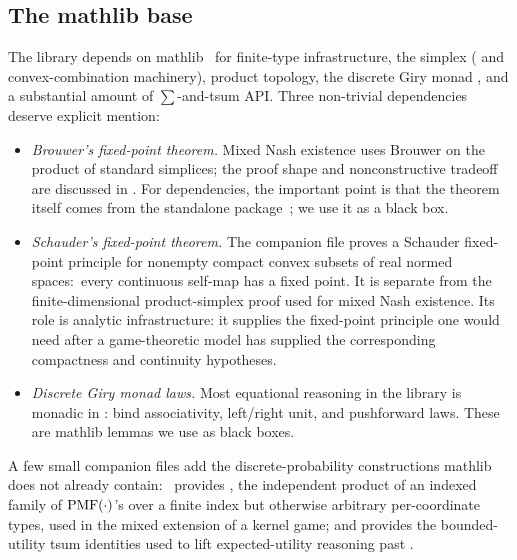 \subsection{The mathlib base}
\label{sec:prelim:mathlib}

The library depends on mathlib~\citep{mathlib2020} for finite-type
infrastructure, the simplex ( and convex-combination
machinery), product topology, the discrete Giry monad , and a
substantial amount of $\sum$-and-tsum API\@.  Three non-trivial dependencies
deserve explicit mention:

\begin{itemize}
\item \emph{Brouwer's fixed-point theorem.}  Mixed Nash existence
uses Brouwer on the product of standard simplices; the proof shape
and nonconstructive tradeoff are discussed in
.  For dependencies, the important
point is that the theorem itself comes from the standalone
 package~\citep{harfeFixedPointTheorems};
we use it as a black box.

\item \emph{Schauder's fixed-point theorem.}  The companion file
 proves a Schauder fixed-point
principle for nonempty compact convex subsets of real normed
spaces:\ every continuous self-map has a fixed point.  It is
separate from the finite-dimensional product-simplex proof used
for mixed Nash existence.  Its role is analytic infrastructure:
it supplies the fixed-point principle one would need after a
game-theoretic model has supplied the corresponding compactness
and continuity hypotheses.

\item \emph{Discrete Giry monad laws.}  Most equational reasoning
in the library is monadic in : bind associativity,
left/right unit, and pushforward laws.  These are mathlib lemmas
we use as black boxes.
\end{itemize}

A few small companion files add the discrete-probability
constructions mathlib does not already contain:\ 
provides , the independent product of an indexed family of
$\mathrm{PMF}(\cdot)$'s over a finite index but otherwise arbitrary
per-coordinate types, used in the mixed extension of a kernel game;
and  provides the bounded-utility tsum
identities used to lift expected-utility reasoning past
.
